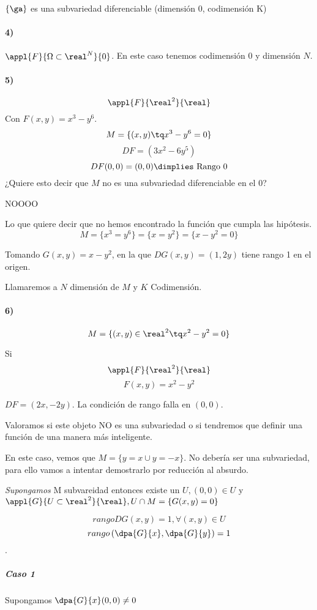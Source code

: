  $\{\ga\}$ es una subvariedad diferenciable (dimensión 0, codimensión K)
 
 \paragraph{4)} $\appl{F}{\Omega\subset\real^N}{0}$. En este caso tenemos codimensión $0$ y dimensión $N$.
 
\paragraph{5)}
   \[\appl{F}{\real^2}{\real}\]  
  Con $F(x,y) = x^3 - y^6$.
  \[M = \{(x,y) \tq x^3-y^6 = 0\}\]
  \[DF = (3x^2-6y^5)\]
  \[DF(0,0) = (0,0) \dimplies \text{ Rango 0}\]
  ¿Quiere esto decir que $M$ no es una subvariedad diferenciable en el 0?
  
  NOOOO
  
  Lo que quiere decir que no hemos encontrado la función que cumpla las hipótesis.
  \[M = \{x^3=y^6\} = \{x = y^2\}  = \{x-y^2 = 0\}\]
  
  Tomando $G(x,y) = x-y^2$, en la que $DG(x,y) = (1,2y)$ tiene rango 1 en el origen.
  

  Llamaremos a $N$ dimensión de $M$ y $K$ Codimensión.
 
  \paragraph{6)}
  
  \[M = \{(x,y)\in \real^2 \tq x^2-y^2 = 0\}\]
  
  Si 
	\[\appl{F}{\real^2}{\real}\]
	\[F(x,y) = x^2-y^2\]
  
  $DF = (2x,-2y)$. La condición de rango falla en $(0,0)$.
  
  Valoramos si este objeto NO es una subvariedad o si tendremos que definir una función de una manera más inteligente.
  
  En este caso, vemos que $M = \{ y=x \cup y = -x \}$. No debería ser una subvariedad, para ello vamos a intentar demostrarlo por reducción al absurdo.
  
  \emph{Supongamos} M subvareidad entonces existe un $U, (0,0) \in U$ y $\appl{G}{U\subset\real^2}{\real}, U\cap M = \{G(x,y) = 0\}$
  
\[rango DG(x,y) = 1, \forall(x,y) \in U\]
\[rango\left(\dpa{G}{x},\dpa{G}{y}\right) = 1\].

\subparagraph{Caso 1} Supongamos $\dpa{G}{x}(0,0) \neq 0$

